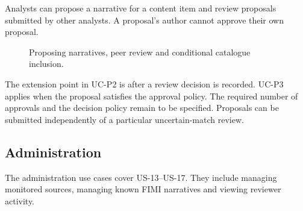 \documentclass[12pt,a4paper]{article}
\newcommand{\umlactor}[4]{%
  \begin{scope}[shift={(#2,#3)},draw=ink,line width=.8pt]
    \draw (0,.45) circle (.18);
    \draw (0,.27)--(0,-.35);
    \draw (-.34,.03)--(.34,.03);
    \draw (0,-.35)--(-.30,-.82);
    \draw (0,-.35)--(.30,-.82);
    \coordinate (#1) at (.34,.03);
    \coordinate (#1-top) at (0,.66);
    \coordinate (#1-bottom) at (0,-.84);
    \node[below,text=ink,font=\small,align=center] at (0,-.9) {#4};
  \end{scope}
}
\begin{document}
Analysts can propose a narrative for a content item and review proposals
submitted by other analysts. A proposal's author cannot approve their
own proposal.

\begin{figure}[H]
\centering
{}
\caption{Proposing narratives, peer review and conditional catalogue inclusion.}
\label{fig:proposal-use-cases}
\end{figure}

The extension point in UC-P2 is after a review decision is recorded.
UC-P3 applies when the proposal satisfies the approval policy.
The required number of approvals and the decision policy remain to be
specified. Proposals can be submitted independently of a particular
uncertain-match review.

\clearpage
\subsection{Administration}


The administration use cases cover US-13--US-17.
They include managing monitored sources, managing known
FIMI narratives and viewing reviewer activity.
\end{document}
